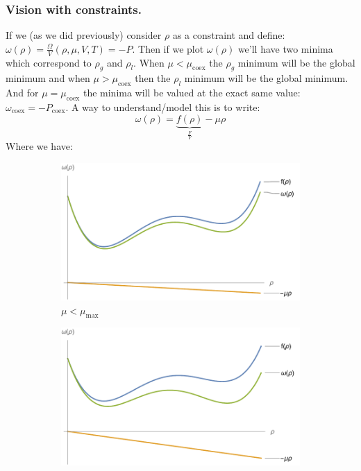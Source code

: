 \documentclass[10pt,a4paper]{book}
\begin{document}
\subsubsection{Vision with constraints.}
If we (as we did previously) consider $\rho$ as a constraint and define: $\omega(\rho) = \frac{\Omega}{V}(\rho,\mu, V, T) = - P$. Then if we plot $\omega(\rho)$ we'll have two minima which correspond to $\rho_g$ and $\rho_l$. When $\mu < \mu_\text{coex}$ the $\rho_g$ minimum will be the global minimum and when $\mu > \mu_\text{coex}$ then the $\rho_l$ minimum will be the global minimum. And for $\mu = \mu_\text{coex}$ the minima will be valued at the exact same value: $\omega_{\text{coex}} = - P_{\text{coex}}$. A way to understand/model this is to write:
\[
\omega(\rho) = \underbrace{f(\rho)}_{\frac{F}{V}} - \mu \rho
\]
Where we have:
\begin{figure}[h!]
     \centering
     \begin{subfigure}[b]{0.3\textwidth}
         \centering
         \includegraphics[width=\textwidth]{graphs/vision_with_constraint_1}
         \caption{$\mu < \mu_\text{max}$}
     \end{subfigure}
     \hfill
     \begin{subfigure}[b]{0.3\textwidth}
         \centering
         \includegraphics[width=\textwidth]{graphs/vision_with_constraint_2}

\end{subfigure}
\end{figure}
\end{document}
